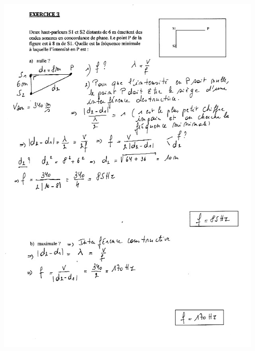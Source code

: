 \includegraphics[width=18.253cm,height=25.273cm]{Pictures/100000010000027000000360F8FFC5B3763173F1.png}

